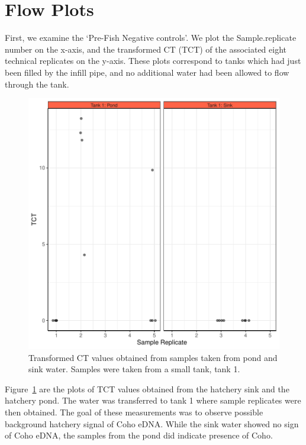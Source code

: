 \section{Flow Plots}



 First, we examine the `Pre-Fish Negative controls'. We plot the Sample.replicate number on the x-axis, and the transformed CT (TCT) of the associated eight technical replicates on the y-axis. These plots correspond to tanks which had just been filled by the infill pipe, and no additional water had been allowed to flow through the tank.


\begin{figure}[H]
\includegraphics[scale=0.8]{Chapter4Images/pondandsink.pdf}
\caption{Transformed CT values obtained from samples taken from pond and sink water. Samples were taken from a small tank, tank 1.}
\label{fig:sinkandpond}
\end{figure}

Figure~\ref{fig:sinkandpond} are the plots of TCT values obtained from the hatchery sink and the hatchery pond. The water was transferred to tank 1 where sample replicates were then obtained. The goal of these measurements was to observe possible background hatchery signal of Coho eDNA. While the sink water showed no sign of Coho eDNA, the samples from the pond did indicate presence of Coho.




